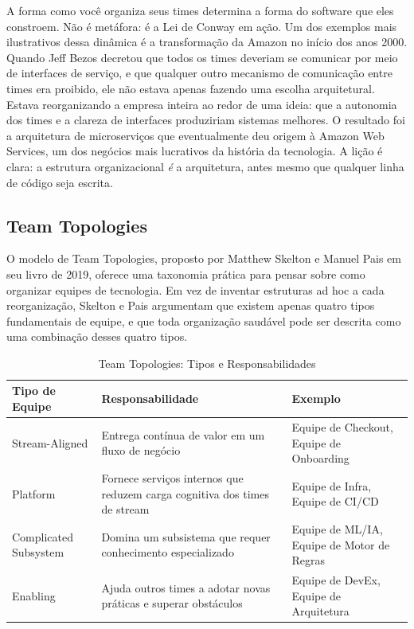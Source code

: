 A forma como você organiza seus times determina a forma do software que eles
constroem. Não é metáfora: é a Lei de Conway em ação. Um dos exemplos mais
ilustrativos dessa dinâmica é a transformação da Amazon no início dos anos 2000.
Quando Jeff Bezos decretou que todos os times deveriam se comunicar por meio
de interfaces de serviço, e que qualquer outro mecanismo de comunicação entre
times era proibido, ele não estava apenas fazendo uma escolha arquitetural.
Estava reorganizando a empresa inteira ao redor de uma ideia: que a autonomia
dos times e a clareza de interfaces produziriam sistemas melhores. O resultado
foi a arquitetura de microserviços que eventualmente deu origem à Amazon Web
Services, um dos negócios mais lucrativos da história da tecnologia. A lição
é clara: a estrutura organizacional \textit{é} a arquitetura, antes mesmo que
qualquer linha de código seja escrita.

\subsection{Team Topologies}

O modelo de Team Topologies, proposto por Matthew Skelton e Manuel Pais em
seu livro de 2019, oferece uma taxonomia prática para pensar sobre como
organizar equipes de tecnologia. Em vez de inventar estruturas ad hoc a cada
reorganização, Skelton e Pais argumentam que existem apenas quatro tipos
fundamentais de equipe, e que toda organização saudável pode ser descrita
como uma combinação desses quatro tipos.

\begin{table}[htbp]
\centering
\caption{Team Topologies: Tipos e Responsabilidades}
\begin{tabular}{|p{3.5cm}|p{4.5cm}|p{5cm}|}
\hline
\textbf{Tipo de Equipe} & \textbf{Responsabilidade} & \textbf{Exemplo} \\
\hline
Stream-Aligned & Entrega contínua de valor em um fluxo de negócio & Equipe de Checkout, Equipe de Onboarding \\
\hline
Platform & Fornece serviços internos que reduzem carga cognitiva dos times de stream & Equipe de Infra, Equipe de CI/CD \\
\hline
Complicated Subsystem & Domina um subsistema que requer conhecimento especializado & Equipe de ML/IA, Equipe de Motor de Regras \\
\hline
Enabling & Ajuda outros times a adotar novas práticas e superar obstáculos & Equipe de DevEx, Equipe de Arquitetura \\
\hline
\end{tabular}
\end{table}

